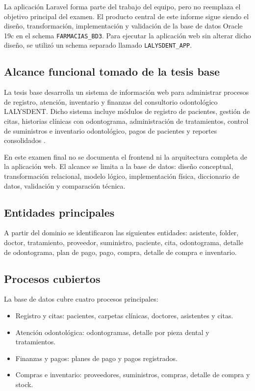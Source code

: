 La aplicación Laravel forma parte del trabajo del equipo, pero no reemplaza el objetivo principal del examen. El producto central de este informe sigue siendo el diseño, transformación, implementación y validación de la base de datos Oracle 19c en el schema \texttt{FARMACIAS\_BD3}. Para ejecutar la aplicación web sin alterar dicho diseño, se utilizó un schema separado llamado \texttt{LALYSDENT\_APP}.

\subsection{Alcance funcional tomado de la tesis base}

La tesis base desarrolla un sistema de información web para administrar procesos de registro, atención, inventario y finanzas del consultorio odontológico LALYSDENT. Dicho sistema incluye módulos de registro de pacientes, gestión de citas, historias clínicas con odontograma, administración de tratamientos, control de suministros e inventario odontológico, pagos de pacientes y reportes consolidados \parencite{tesisbase,calvocobos2025web}.

En este examen final no se documenta el frontend ni la arquitectura completa de la aplicación web. El alcance se limita a la base de datos: diseño conceptual, transformación relacional, modelo lógico, implementación física, diccionario de datos, validación y comparación técnica.

\subsection{Entidades principales}

A partir del dominio se identificaron las siguientes entidades: asistente, folder, doctor, tratamiento, proveedor, suministro, paciente, cita, odontograma, detalle de odontograma, plan de pago, pago, compra, detalle de compra e inventario.

\subsection{Procesos cubiertos}

La base de datos cubre cuatro procesos principales:

\begin{itemize}
  \item Registro y citas: pacientes, carpetas clínicas, doctores, asistentes y citas.
  \item Atención odontológica: odontogramas, detalle por pieza dental y tratamientos.
  \item Finanzas y pagos: planes de pago y pagos registrados.
  \item Compras e inventario: proveedores, suministros, compras, detalle de compra y stock.
\end{itemize}

